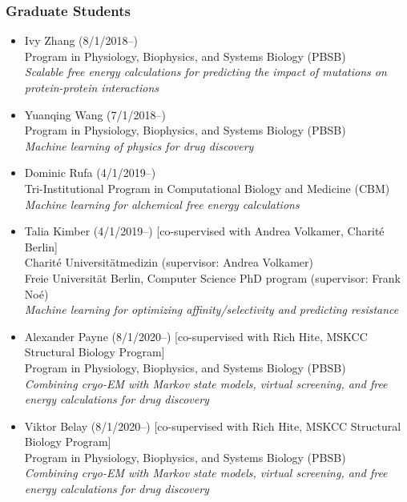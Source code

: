 \documentclass[10pt]{article}
\begin{document}
\subsubsection*{Graduate Students}

\begin{itemize}
  \item Ivy Zhang (8/1/2018--)\\
  Program in Physiology, Biophysics, and Systems Biology (PBSB)\\
  \emph{Scalable free energy calculations for predicting the impact of mutations on protein-protein interactions}
  
  \item Yuanqing Wang (7/1/2018--)\\
  Program in Physiology, Biophysics, and Systems Biology (PBSB)\\
  \emph{Machine learning of physics for drug discovery}
  
  \item Dominic Rufa (4/1/2019--)\\
  Tri-Institutional Program in Computational Biology and Medicine (CBM)\\
  \emph{Machine learning for alchemical free energy calculations}

  \item Talia Kimber (4/1/2019--) [co-supervised with Andrea Volkamer, Charit\'e Berlin] \\
  Charit\'e Universit\"{a}tmedizin (supervisor: Andrea Volkamer)\\
  Freie Universit\"{a}t Berlin, Computer Science PhD program (supervisor: Frank No\'{e})\\
  \emph{Machine learning for optimizing affinity/selectivity and predicting resistance}
  
  \item Alexander Payne (8/1/2020--) [co-supervised with Rich Hite, MSKCC Structural Biology Program] \\
  Program in Physiology, Biophysics, and Systems Biology (PBSB)\\
  \emph{Combining cryo-EM with Markov state models, virtual screening, and free energy calculations for drug discovery}
  
  \item Viktor Belay (8/1/2020--) [co-supervised with Rich Hite, MSKCC Structural Biology Program] \\
  Program in Physiology, Biophysics, and Systems Biology (PBSB)\\
  \emph{Combining cryo-EM with Markov state models, virtual screening, and free energy calculations for drug discovery}


\end{itemize}
\end{document}
